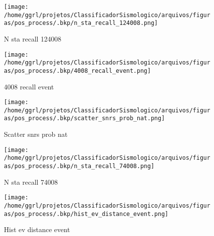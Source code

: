                     \begin{figure}[H]
                        \centering
                        \texttt{[image: /home/ggrl/projetos/ClassificadorSismologico/arquivos/figuras/pos\_process/.bkp/n\_sta\_recall\_124008.png]}
                        \caption{N sta recall 124008}
                        \label{fig:n_sta_recall_124008}
                    \end{figure}
                

                    \begin{figure}[H]
                        \centering
                        \texttt{[image: /home/ggrl/projetos/ClassificadorSismologico/arquivos/figuras/pos\_process/.bkp/4008\_recall\_event.png]}
                        \caption{4008 recall event}
                        \label{fig:4008_recall_event}
                    \end{figure}
                

                    \begin{figure}[H]
                        \centering
                        \texttt{[image: /home/ggrl/projetos/ClassificadorSismologico/arquivos/figuras/pos\_process/.bkp/scatter\_snrs\_prob\_nat.png]}
                        \caption{Scatter snrs prob nat}
                        \label{fig:scatter_snrs_prob_nat}
                    \end{figure}
                

                    \begin{figure}[H]
                        \centering
                        \texttt{[image: /home/ggrl/projetos/ClassificadorSismologico/arquivos/figuras/pos\_process/.bkp/n\_sta\_recall\_74008.png]}
                        \caption{N sta recall 74008}
                        \label{fig:n_sta_recall_74008}
                    \end{figure}
                

                    \begin{figure}[H]
                        \centering
                        \texttt{[image: /home/ggrl/projetos/ClassificadorSismologico/arquivos/figuras/pos\_process/.bkp/hist\_ev\_distance\_event.png]}
                        \caption{Hist ev distance event}
                        \label{fig:hist_ev_distance_event}
                    \end{figure}
                

